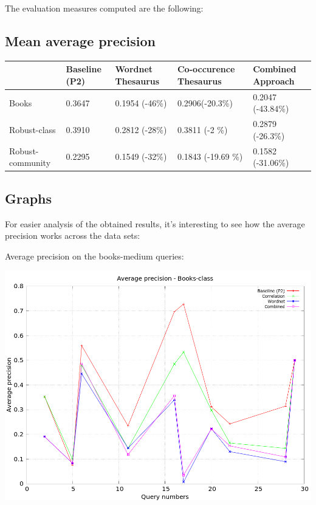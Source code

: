 \documentclass[a4paper, 12pt, notitlepage]{report}
\begin{document}
The evaluation measures computed are the following:

\subsection*{Mean average precision}

\begin{table}[h]
\begin{tabular}{| p{2.5cm} | p{2.5cm} | p{2.5cm} | p{2.5cm} | p{2.5cm} |}
\hline
\rowcolor[HTML]{BBDAFF} 
                                         & Baseline (P2) & Wordnet Thesaurus & Co-occurence Thesaurus & Combined Approach \\ \hline
\cellcolor[HTML]{BBDAFF}Books            & 0.3647        & 0.1954 (-46\%)    & 0.2906(-20.3\%)        & 0.2047 (-43.84\%) \\ \hline
\cellcolor[HTML]{BBDAFF}Robust-class     & 0.3910        & 0.2812 (-28\%)    & 0.3811 (-2 \%)         & 0.2879 (-26.3\%)  \\ \hline
\cellcolor[HTML]{BBDAFF}Robust-community & 0.2295        & 0.1549 (-32\%)    & 0.1843 (-19.69 \%)     & 0.1582 (-31.06\%) \\ \hline
\end{tabular}
\end{table}

\subsection*{Graphs}
For easier analysis of the obtained results, it's interesting to see how the average precision works across the data sets:

Average precision on the books-medium queries:
\begin{center}
\includegraphics[scale = 0.4]{books_avg}
\end{center}
\end{document}
